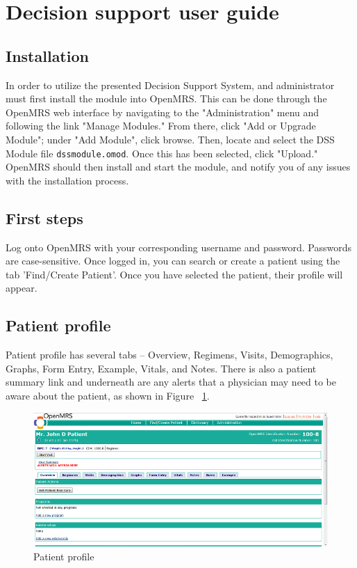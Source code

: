 \documentclass[12pt,letterpaper]{article}
\begin{document}
\newpage 
\section{Decision support user guide} \label{sec:USER_GUIDE}

\subsection{Installation}
	In order to utilize the presented Decision Support System, 
and administrator must first install the module into OpenMRS. This can 
be done through the OpenMRS web interface by navigating to the "Administration" menu and following the link "Manage Modules." From there, 
click "Add or Upgrade Module"; under "Add Module", click browse. Then, 
locate and select the DSS Module file \texttt{dssmodule.omod}. Once 
this has been selected, click "Upload." OpenMRS should then install and 
start the module, and notify you of any issues with the installation 
process.

\subsection{First steps}
	Log onto OpenMRS with your corresponding username and password. Passwords are case-sensitive. Once logged in, you can search or create a patient using the tab 'Find/Create Patient'. Once you have selected the patient, their profile will appear.

\subsection{Patient profile}
	Patient profile has several tabs – Overview, Regimens, Visits, Demographics, Graphs, Form Entry, Example, Vitals, and Notes.  There is also a patient summary link and underneath are any alerts that a physician may need to be aware about the patient, as shown in Figure ~\ref{fig:PATIENT_PROFILE}.

\begin{figure}\begin{center}
\includegraphics[width=6.5in]{user_guide/patient_profile.png}
\end{center}
\caption{Patient profile}
\label{fig:PATIENT_PROFILE}
\end{figure}
\end{document}
